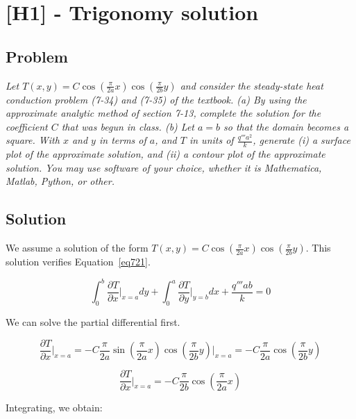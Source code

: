 \section{[H1] - Trigonomy solution}
\label{prob75}

\subsection{Problem}
\textit{Let $T(x,y) = C \cos \left(\frac{\pi}{2a}x \right) \cos \left(\frac{\pi}{2b}y \right)$ and consider the steady-state heat conduction problem (7-34) and (7-35) of the textbook. (a) By using the approximate analytic method of section 7-13, complete the solution for the coefficient $C$ that was begun in class. (b) Let $a = b$ so that the domain becomes a square. With $x$ and $y$ in terms of $a$, and $T$ in units of $\frac{q'''a^2}{k}$, generate (i) a surface plot of the approximate solution, and (ii) a contour plot of the approximate solution. You may use software of your choice, whether it is Mathematica, Matlab, Python, or other.}

\subsection{Solution}

We assume a solution of the form $T(x,y) = C \cos \left(\frac{\pi}{2a}x \right) \cos \left(\frac{\pi}{2b}y \right)$. This solution verifies Equation~\ref{eq721}.

\begin{equation}\label{eq721}
\int_0^b \frac{\partial T}{\partial x}\bigg\rvert_{x=a} dy + \int_0^a \frac{\partial T}{\partial y}\bigg\rvert_{y=b} dx + \frac{q'''ab}{k} = 0
\end{equation}

We can solve the partial differential first.

\begin{equation}\label{eq722}
\frac{\partial T}{\partial x}\bigg\rvert_{x=a} = -C \frac{\pi}{2a} \sin \left(\frac{\pi}{2a}x \right) \cos \left(\frac{\pi}{2b}y \right) \bigg\rvert_{x=a} = -C \frac{\pi}{2a}\cos \left(\frac{\pi}{2b}y \right)
\end{equation}


\begin{equation}\label{eq723}
\frac{\partial T}{\partial x}\bigg\rvert_{x=a} = -C \frac{\pi}{2b}\cos \left(\frac{\pi}{2a}x \right)
\end{equation}

Integrating, we obtain:

